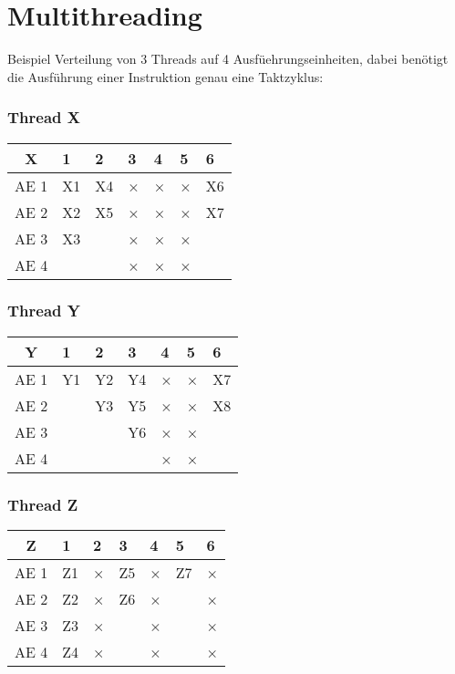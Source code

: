 \section{Multithreading}
Beispiel Verteilung von 3 Threads auf 4 Ausfüehrungseinheiten, dabei benötigt die Ausführung
einer Instruktion genau eine Taktzyklus:
\subsubsection*{Thread X}
\begin{tabular}{|c|llllll|}\hline
  X  & 1 & 2 & 3 & 4 & 5 & 6\\\hline
AE 1 & X1 & X4 & × & × & × & X6\\
AE 2 & X2 & X5 & × & × & × & X7\\
AE 3 & X3 &    & × & × & × &   \\
AE 4 &    &    & × & × & × &   \\\hline
\end{tabular}\par
\subsubsection*{Thread Y}
\begin{tabular}{|c|llllll|}\hline
  Y  & 1 & 2 & 3 & 4 & 5 & 6\\\hline
AE 1 & Y1 & Y2 & Y4 & × & × & X7\\
AE 2 &    & Y3 & Y5 & × & × & X8\\
AE 3 &    &    & Y6 & × & × &   \\
AE 4 &    &    &    & × & × &   \\\hline
\end{tabular}\par
\subsubsection*{Thread Z}
\begin{tabular}{|c|llllll|}\hline
  Z  & 1 & 2 & 3 & 4 & 5 & 6\\\hline
AE 1 & Z1 & × & Z5 & × & Z7 & ×\\
AE 2 & Z2 & × & Z6 & × &    & ×\\
AE 3 & Z3 & × &    & × &    & ×\\
AE 4 & Z4 & × &    & × &    & ×\\\hline
\end{tabular}\par

